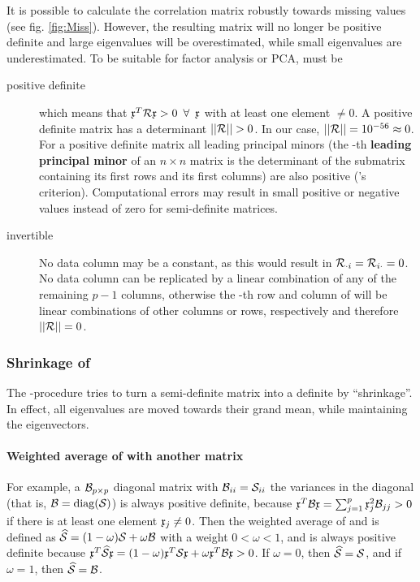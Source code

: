 It is possible to calculate the correlation matrix  robustly towards missing values (see fig. \ref{fig:Miss}). However, the resulting matrix will no longer be positive definite and large eigenvalues will be overestimated, while small eigenvalues are underestimated. To be suitable for factor analysis or PCA,  must be
\begin{description}
  \item[positive definite]{which means that \(\mathfrak{x}^T \mathcal{R} \mathfrak{x} > 0\enspace \forall\enspace \mathfrak{x} \) with at least one element \(\neq 0 \). A positive definite matrix has a determinant \(||\mathcal{R}|| > 0 \). In our case, \(||\mathcal{R}|| = \num{e-56} \approx 0 \). For a positive definite matrix all leading principal minors (the -th \textbf{leading principal minor} of an \(n \times n \) matrix is the determinant of the submatrix containing its first  rows and its first  columns) are also positive ('s criterion). Computational errors may result in small positive or negative values instead of zero for semi-definite matrices.}
  \item[invertible]{No data column  may be a constant, as this would result in \(\mathcal{R}_{\cdot i} = \mathcal{R}_{i\cdot} = 0 \). No data column  can be replicated by a linear combination of any of the remaining \(p-1 \) columns, otherwise the -th row and column of  will be linear combinations of other columns or rows, respectively and therefore \(||\mathcal{R}|| = 0 \).}
\end{description}

\subsubsection{Shrinkage of }\label{text:shrinkage}

The -procedure \parencite{Scha-05,Kwa-11,Led-03} tries to turn a semi-definite matrix into a definite  by ``shrinkage''. In effect, all eigenvalues are moved towards their grand mean, while maintaining the eigenvectors.

\paragraph{Weighted average of  with another matrix}
For example, a \(\mathcal{B}_{p \times p} \) diagonal matrix with \(\mathcal{B}_{ii} = \mathcal{S}_{ii} \) the variances in the diagonal (that is, \(\mathcal{B} = \operatorname{diag}(\mathcal{S}) \)) is always positive definite, because \(\mathfrak{x}^T \mathcal{B} \mathfrak{x} = \sum_{j=1}^{p} \mathfrak{x}_j^2 \mathcal{B}_{jj} > 0 \) if there is at least one element \(\mathfrak{x}_j \neq 0 \). Then the weighted average of  and  is defined as \(\widehat{\mathcal{S}} = (1-\omega)\mathcal{S} + \omega \mathcal{B} \) with a weight \(0 < \omega < 1 \), and is always positive definite because \(\mathfrak{x}^T \widehat{\mathcal{S}} \mathfrak{x} = (1-\omega) \mathfrak{x}^T \mathcal{S} \mathfrak{x} + \omega \mathfrak{x}^T \mathcal{B} \mathfrak{x} > 0 \). If \(\omega = 0 \), then \(\widehat{\mathcal{S}} = \mathcal{S} \), and if \(\omega = 1 \), then \(\widehat{\mathcal{S}} = \mathcal{B} \).

